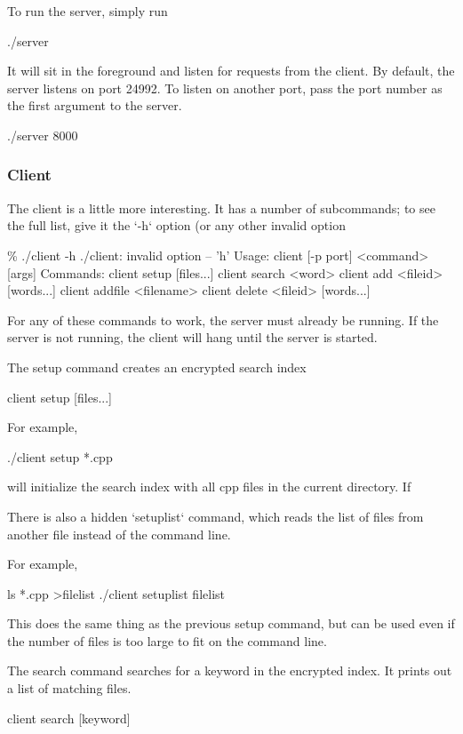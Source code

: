 To run the server, simply run

    ./server

It will sit in the foreground and listen for requests from the client.
By default, the server listens on port 24992.
To listen on another port, pass the port number as the first argument to the server.

    ./server 8000

\subsubsection{Client}

The client is a little more interesting.
It has a number of subcommands;
to see the full list, give it the `-h` option (or any other invalid option

    \% ./client -h
    ./client: invalid option -- 'h'
    Usage: client [-p port] <command> [args]
    Commands:
        client setup [files...]
        client search <word>
        client add <fileid> [words...]
        client addfile <filename>
        client delete <fileid> [words...]

For any of these commands to work, the server must already be running.
If the server is not running, the client will hang until the server is started.


The setup command creates an encrypted search index

    client setup [files...]

For example,

    ./client setup *.cpp

will initialize the search index with all cpp files in the current directory.
If

There is also a hidden `setuplist` command, which reads the list of files from another file
instead of the command line.

For example,

    ls *.cpp >filelist
    ./client setuplist filelist

This does the same thing as the previous setup command, but can be used even if
the number of files is too large to fit on the command line.


The search command searches for a keyword in the encrypted index.
It prints out a list of matching files.

    client search [keyword]


